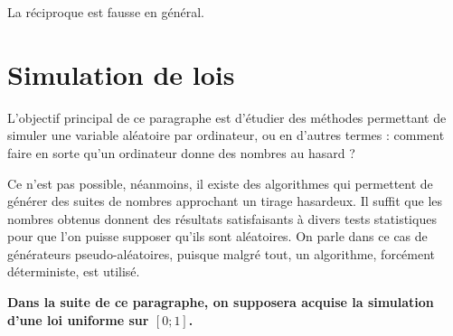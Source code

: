 	La réciproque est fausse en général.
	
\section{Simulation de lois}
L'objectif principal de ce paragraphe est d'étudier des méthodes permettant de simuler une variable aléatoire par ordinateur, ou en d'autres termes : comment faire en sorte qu'un ordinateur donne des nombres au hasard ?

Ce n'est pas possible, néanmoins, il existe des algorithmes qui permettent de générer des suites de nombres approchant un tirage hasardeux. Il suffit que les nombres obtenus donnent des résultats satisfaisants à divers tests statistiques pour que l'on puisse supposer qu’ils sont aléatoires. On parle dans ce cas de générateurs pseudo-aléatoires, puisque malgré tout, un algorithme, forcément déterministe, est utilisé. 

\textbf{Dans la suite de ce paragraphe, on supposera acquise la simulation d'une loi uniforme sur $[0;1]$.}


